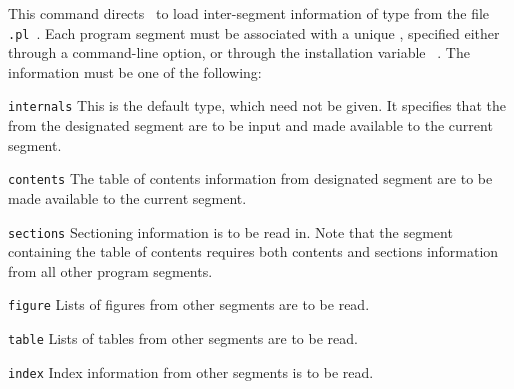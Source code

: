 \begin{changebar}
\begin{htmllist}
%
\item [ \Lc{internal[}\Meta{type}\texttt{]\char123}%
 \Meta{prefix}\texttt{\char125}\label{internal}]
%
This command directs \latextohtml\ to load inter-segment information 
of type  from the file \texttt{.pl}~.  
Each program segment must be associated with a unique , 
specified either through a command-line option, 
or through the installation variable ~.
The information  must be one of the following:
%
\begin{htmllist}\addtolength{\leftskip}{15pt}%
%
%
%
\item[\texttt{internals}]  
This is the default type, which need not be
        given.  It specifies that the
         from the
        designated segment are to be input and made available
        to the current segment.  
\html{\\}%
%
%
\item[\texttt{contents}]  
The table of contents information from
        designated segment are to be made available to the
        current segment.
\html{\\}%
%
%
\item[\texttt{sections}]  
Sectioning information is to be read in.
        Note that the segment containing the table of contents
        requires both contents and sections information
        from all other program segments.
\html{\\}%
%
%
%
\item[\texttt{figure}]  
Lists of figures from other segments are to be read.
\html{\\}%
%
%
%
\item[\texttt{table}] 
Lists of tables from other segments are to be read.
\html{\\}%
%
%
\item[\texttt{index}] 
Index information from other segments is to be read.
\html{\\}%

\end{htmllist}
\end{htmllist}
\end{changebar}
